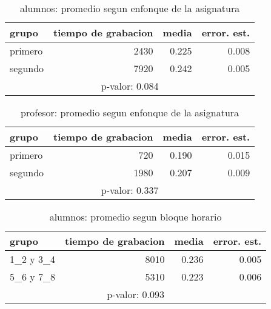 \documentclass[spanish]{article}
\begin{document}
\begin{table}[h!]
\begin{center}
\begin{tabular}{|l|r|r|r|}
\hline
grupo   & tiempo de grabacion & media          & error. est.    \\ \hline
primero &                2430 &          0.225 &           0.008\\ \hline
segundo &                7920 &          0.242 &           0.005\\ \hline
\multicolumn{4}{|c|}{p-valor: 0.084} \\ \hline
\end{tabular}
\caption{alumnos: promedio segun enfonque de la asignatura}
\end{center}
\end{table}

\begin{table}[h!]
\begin{center}
\begin{tabular}{|l|r|r|r|}
\hline
grupo   & tiempo de grabacion & media          & error. est.     \\ \hline
primero &                 720 &          0.190 &            0.015\\ \hline
segundo &                1980 &          0.207 &            0.009\\ \hline
\multicolumn{4}{|c|}{p-valor: 0.337} \\ \hline
\end{tabular}
\caption{profesor: promedio segun enfonque de la asignatura}
\end{center}
\end{table}

\begin{table}[h!]
\begin{center}
\begin{tabular}{|l|r|r|r|}
\hline
grupo     & tiempo de grabacion & media          & error. est.     \\ \hline
1\_2 y 3\_4 &                8010 &          0.236 &            0.005\\ \hline
5\_6 y 7\_8 &                5310 &          0.223 &            0.006\\ \hline
\multicolumn{4}{|c|}{p-valor: 0.093} \\ \hline
\end{tabular}
\caption{alumnos: promedio segun bloque horario}
\end{center}
\end{table}
\end{document}
